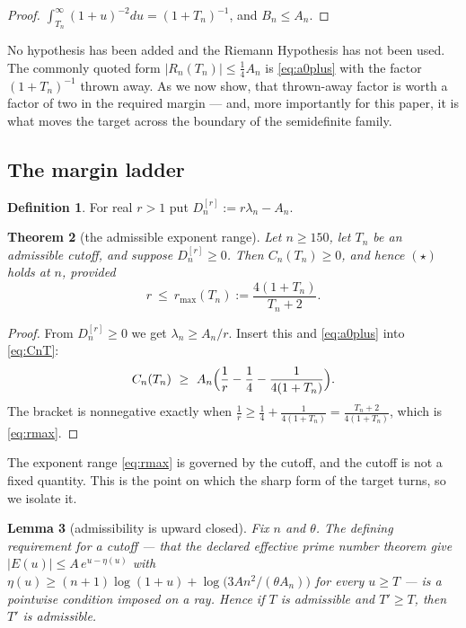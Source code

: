 \documentclass[11pt]{amsart}
\newtheorem{theorem}{Theorem}[section]
\newtheorem{lemma}[theorem]{Lemma}
\theoremstyle{definition}
\newtheorem{definition}[theorem]{Definition}
\theoremstyle{remark}
\theoremstyle{definition}
\begin{document}
\begin{proof}
$\int_{T_n}^\infty(1+u)^{-2}du=(1+T_n)^{-1}$, and $B_n\le A_n$.
\end{proof}

No hypothesis has been added and the Riemann Hypothesis has not been used. The commonly quoted
form $|R_n(T_n)|\le\tfrac14A_n$ is \eqref{eq:a0plus} with the factor $(1+T_n)^{-1}$ thrown away.
As we now show, that thrown-away factor is worth a factor of two in the required margin --- and,
more importantly for this paper, it is what moves the target across the boundary of the
semidefinite family.

\subsection{The margin ladder}\label{sec:ladder}

\begin{definition}\label{def:margin}
For real $r>1$ put $D_n^{[r]}:=r\lambda_n-A_n$.
\end{definition}

\begin{theorem}[the admissible exponent range]\label{thm:range}
Let $n\ge150$, let $T_n$ be an admissible cutoff, and suppose $D_n^{[r]}\ge0$. Then
$C_n(T_n)\ge0$, and hence $(\star)$ holds at $n$, provided
\begin{equation}\label{eq:rmax}
   r\ \le\ r_{\max}(T_n):=\frac{4(1+T_n)}{T_n+2} .
\end{equation}
\end{theorem}

\begin{proof}
From $D_n^{[r]}\ge0$ we get $\lambda_n\ge A_n/r$. Insert this and \eqref{eq:a0plus} into
\eqref{eq:CnT}:
\[
   C_n(T_n)\ \ge\ A_n\Bigl(\frac1r-\frac14-\frac{1}{4(1+T_n)}\Bigr).
\]
The bracket is nonnegative exactly when $\tfrac1r\ge\tfrac14+\tfrac1{4(1+T_n)}
=\tfrac{T_n+2}{4(1+T_n)}$, which is \eqref{eq:rmax}.
\end{proof}

The exponent range \eqref{eq:rmax} is governed by the cutoff, and the cutoff is not a fixed
quantity. This is the point on which the sharp form of the target turns, so we isolate it.

\begin{lemma}[admissibility is upward closed]\label{lem:upward}
Fix $n$ and $\theta$. The defining requirement for a cutoff --- that the declared effective prime
number theorem give $|E(u)|\le A\,e^{u-\eta(u)}$ with
$\eta(u)\ge(n+1)\log(1+u)+\log\bigl(3An^2/(\theta A_n)\bigr)$ for every $u\ge T$ --- is a
pointwise condition imposed on a ray. Hence if $T$ is admissible and $T'\ge T$, then $T'$ is
admissible.
\end{lemma}
\end{document}
